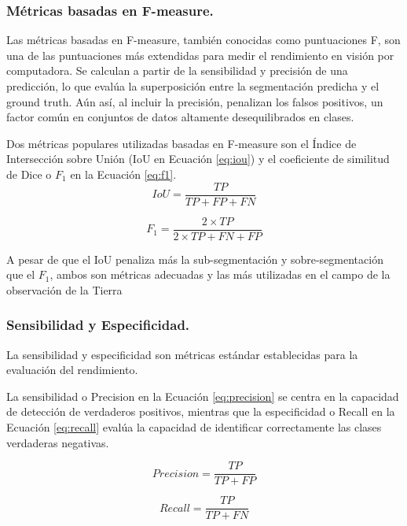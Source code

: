 \subsubsection{Métricas basadas en F-measure.}
Las métricas basadas en F-measure, también conocidas como puntuaciones F, son una de las puntuaciones más extendidas para medir el 
rendimiento en visión por computadora. Se calculan a partir de la sensibilidad y precisión de una predicción, lo que evalúa la 
superposición entre la segmentación predicha y el ground truth. Aún así, al incluir la precisión, penalizan los falsos positivos, 
un factor común en conjuntos de datos altamente desequilibrados en clases. 

Dos métricas populares utilizadas basadas en F-measure son el Índice de Intersección sobre Unión (IoU en Ecuación \ref{eq:iou}) y el coeficiente de similitud de Dice o $F_1$ en la Ecuación \ref{eq:f1}. 
\begin{equation}
    IoU = \frac{TP}{TP + FP + FN}
    \label{eq:iou}
\end{equation}

\begin{equation}
    F_1 = \frac{2 \times TP}{2 \times TP + FN + FP}
    \label{eq:f1}
\end{equation}

A pesar de que el IoU penaliza más la sub-segmentación y sobre-segmentación que el $F_1$, ambos son métricas adecuadas y las más utilizadas en el 
campo de la observación de la Tierra \citep{arnaudo_robust_2023,cabuar_2023,al_dabbagh_2023}

\subsubsection{Sensibilidad y Especificidad.}
La sensibilidad y especificidad son métricas estándar establecidas para la evaluación del rendimiento. 

La sensibilidad o Precision en la Ecuación \ref{eq:precision} se centra en la 
capacidad de detección de verdaderos positivos, mientras que la especificidad o Recall en la Ecuación \ref{eq:recall} evalúa la capacidad de identificar correctamente las clases verdaderas negativas.

\begin{equation}
    Precision = \frac{TP}{TP + FP}
    \label{eq:precision}
\end{equation}

\begin{equation}
    Recall = \frac{TP}{TP + FN}
    \label{eq:recall}
\end{equation}


